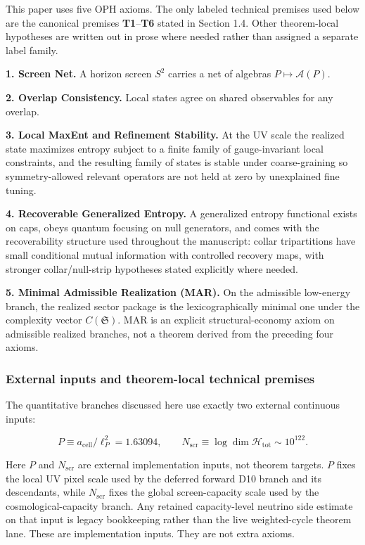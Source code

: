 This paper uses five OPH axioms. The only labeled technical premises used below are the canonical premises \textbf{T1}--\textbf{T6} stated in Section 1.4. Other theorem-local hypotheses are written out in prose where needed rather than assigned a separate label family.

\textbf{1. Screen Net.} A horizon screen \(S^2\) carries a net of algebras \(P \mapsto \mathcal{A}(P)\).

\textbf{2. Overlap Consistency.} Local states agree on shared observables for any overlap.

\textbf{3. Local MaxEnt and Refinement Stability.} At the UV scale the realized state maximizes entropy subject to a finite family of gauge-invariant local constraints, and the resulting family of states is stable under coarse-graining so symmetry-allowed relevant operators are not held at zero by unexplained fine tuning.

\textbf{4. Recoverable Generalized Entropy.} A generalized entropy functional exists on caps, obeys quantum focusing on null generators, and comes with the recoverability structure used throughout the manuscript: collar tripartitions have small conditional mutual information with controlled recovery maps, with stronger collar/null-strip hypotheses stated explicitly where needed.

\textbf{5. Minimal Admissible Realization (MAR).} On the admissible low-energy branch, the realized sector package is the lexicographically minimal one under the complexity vector \(C(\mathfrak S)\). MAR is an explicit structural-economy axiom on admissible realized branches, not a theorem derived from the preceding four axioms.

\subsubsection{External inputs and theorem-local technical premises}\label{14-assumptions-and-external-inputs}

The quantitative branches discussed here use exactly two external continuous inputs:

\[
P \equiv a_{\mathrm{cell}}/\ell_P^2 = 1.63094,
\qquad
N_{\mathrm{scr}} \equiv \log \dim \mathcal H_{\mathrm{tot}} \sim 10^{122}.
\]

Here \(P\) and \(N_{\mathrm{scr}}\) are external implementation inputs, not theorem targets. \(P\) fixes the local UV pixel scale used by the deferred forward D10 branch and its descendants, while \(N_{\mathrm{scr}}\) fixes the global screen-capacity scale used by the cosmological-capacity branch. Any retained capacity-level neutrino side estimate on that input is legacy bookkeeping rather than the live weighted-cycle theorem lane. These are implementation inputs. They are not extra axioms.

